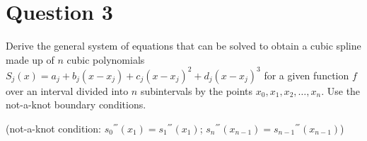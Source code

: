 \section{Question 3}

\begin{question}
    Derive the general system of equations that can be solved to obtain a cubic spline made up of $n$ cubic polynomials $S_j(x) = a_j+b_j(x-x_j)+c_j(x-x_j)^2+d_j(x-x_j)^3$ for a given function $f$ over an interval divided into $n$ subintervals by the points $x_0, x_1, x_2, \dots, x_n$. Use the not-a-knot boundary conditions.
    
    (not-a-knot condition: ${s_0}^{'''}(x_1) = {s_1}^{'''}(x_1)$; ${s_n}^{'''}(x_{n-1}) = {s_{n-1}}^{'''}(x_{n-1})$)
\end{question}

\begin{answer}
    
\end{answer}